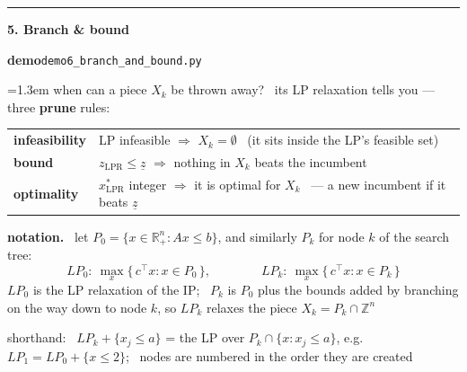 \documentclass[10pt]{article}
\newcommand{\beat}[2]{%
  \par\medskip\needspace{8\baselineskip}%
  {\color{ruleink}\rule{\textwidth}{1pt}}\par\nobreak\vspace{2pt}
  {\large\bfseries #1.\; #2}\par\nobreak\vspace{3pt}}
\newenvironment{board}{%
  \par\vspace{2pt}
  \begingroup\leftskip=1.3em\relax}{%
  \par\endgroup\vspace{2pt}}
\begin{document}
\beat{5}{Branch \& bound}
\par{\leavevmode\color{demoink}\small\textbf{demo}\quad\texttt{demo6\_branch\_and\_bound.py}}\par
\begin{board}
when can a piece $X_k$ be thrown away? \ its LP relaxation tells you --- three \textbf{prune} rules:
\begin{center}
\begin{tabular}{@{}l|l@{}}
 \textbf{infeasibility} & LP infeasible $\Rightarrow$ $X_k = \emptyset$ \ (it sits inside the LP's feasible set) \\[2pt]
 \textbf{bound}         & $z_{\mathrm{LPR}} \le \underline{z}$ $\Rightarrow$ nothing in $X_k$ beats the incumbent \\[2pt]
 \textbf{optimality}    & $x^{*}_{\mathrm{LPR}}$ integer $\Rightarrow$ it is optimal for $X_k$ \ --- a new incumbent if it beats $\underline{z}$ \\
\end{tabular}
\end{center}
\vspace{2pt}

\textbf{notation.} \ let $P_0 = \{x \in \mathbb{R}^n_{+} : Ax \le b\}$, and similarly $P_k$ for node $k$ of the search tree:
\[
  LP_0: \ \max_{x} \{\, c^{\top}x : x \in P_0 \,\},
  \qquad\qquad
  LP_k: \ \max_{x} \{\, c^{\top}x : x \in P_k \,\}
\]
$LP_0$ is the LP relaxation of the IP; \ $P_k$ is $P_0$ plus the bounds added by branching on the way down to node $k$,
so $LP_k$ relaxes the piece $X_k = P_k \cap \mathbb{Z}^n$
\vspace{1pt}

\quad shorthand: \ $LP_k + \{x_j \le a\}$ = the LP over $P_k \cap \{x : x_j \le a\}$, e.g.\ $LP_1 = LP_0 + \{x \le 2\}$; \
nodes are numbered in the order they are created
\vspace{3pt}


\end{board}
\end{document}

